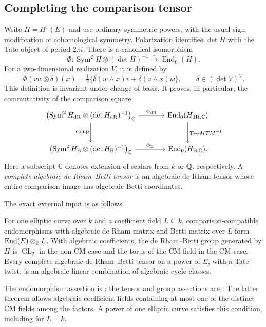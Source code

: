 \subsection{Completing the comparison tensor}\label{sec:comparison-coordinate}
\label{subsec:ksv-completion}
Write $H=H^1(E)$ and use ordinary symmetric powers, with the usual
sign modification of cohomological symmetry.  Polarization identifies
$\det H$ with the Tate object of period $2\pi i$.  There is a canonical
isomorphism
\[
 \Phi:\operatorname{Sym}^2H\otimes(\det H)^{-1}
       \xrightarrow{\sim}\operatorname{End}_0(H).
\]
For a two-dimensional realization $V$, it is defined by
\[
 \Phi(vw\otimes\delta)(x)
   =\tfrac12\{\delta(w\wedge x)v+\delta(v\wedge x)w\},
 \qquad \delta\in(\det V)^\vee.
\]
This definition is invariant under change of basis.  It proves, in
particular, the commutativity of the comparison square
\[
\begin{tikzcd}[column sep=large,row sep=large]
 \bigl(\operatorname{Sym}^2H_{\mathrm{dR}}\otimes
       (\det H_{\mathrm{dR}})^{-1}\bigr)_{\mathbb C}
 \arrow[r,"\Phi_{\mathrm{dR}}"]\arrow[d,"\operatorname{comp}"']
 &\operatorname{End}_0(H_{\mathrm{dR},\mathbb C})
 \arrow[d,"T\mapsto MTM^{-1}"]\\
 \bigl(\operatorname{Sym}^2H_{\mathrm B}\otimes
       (\det H_{\mathrm B})^{-1}\bigr)_{\mathbb C}
 \arrow[r,"\Phi_{\mathrm B}"]
 &\operatorname{End}_0(H_{\mathrm B,\mathbb C}).
\end{tikzcd}
\]
Here a subscript $\mathbb C$ denotes extension of scalars from $k$
or $\mathbb Q$, respectively.  A \emph{complete algebraic de Rham--Betti
tensor} is an algebraic de Rham tensor whose entire comparison image
has algebraic Betti coordinates.

The exact external input is as follows.
\begin{theorem}
\label{thm:ksv-specialized}
For one elliptic curve over $k$ and a coefficient field $L\subseteq k$,
comparison-compatible endomorphisms with algebraic de Rham matrix and
Betti matrix over $L$ form $\operatorname{End}(E)\otimes_{\mathbb Z}L$.
With algebraic coefficients, the de Rham--Betti group generated by
$H$ is $\operatorname{GL}_2$ in the non-CM case and the torus of the
CM field in the CM case.  Every complete algebraic de Rham--Betti tensor
on a power of $E$, with a Tate twist, is an algebraic linear combination
of algebraic cycle classes.
\end{theorem}
The endomorphism assertion is
\cite[Theorem~5.10 and Corollary~5.11]{KSV}; the tensor and group
assertions are \cite[Theorem~5.13]{KSV}.  The latter theorem allows
algebraic coefficient fields containing at most one of the distinct
CM fields among the factors.  A power of one elliptic curve satisfies
this condition, including for $L=k$.

